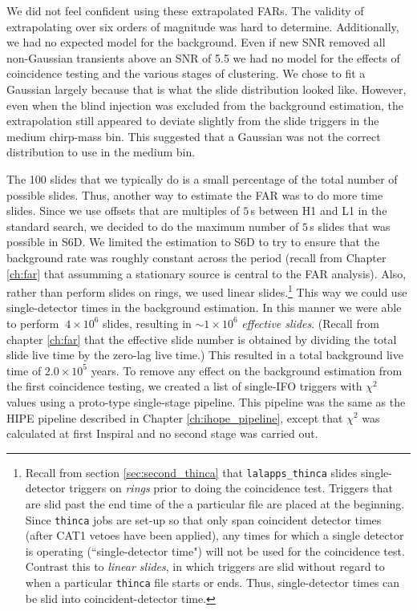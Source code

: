 We did not feel confident using these extrapolated \acp{FAR}. The validity of
extrapolating over six orders of magnitude was hard to determine. Additionally,
we had no expected model for the background. Even if new \ac{SNR} removed all
non-Gaussian transients above an \ac{SNR} of 5.5 we had no model for the
effects of coincidence testing and the various stages of clustering. We chose
to fit a Gaussian largely because that is what the slide distribution looked
like. However, even when the blind injection was excluded from the background
estimation, the extrapolation still appeared to deviate slightly from the slide
triggers in the medium chirp-mass bin. This suggested that a Gaussian was not
the correct distribution to use in the medium bin.

The 100 slides that we typically do is a small percentage of the total number
of possible slides. Thus, another way to estimate the \ac{FAR} was to do more
time slides. Since we use offsets that are multiples of $5\,$s between H1 and
L1 in the standard search, we decided to do the maximum number of $5\,$s slides
that was possible in S6D. We limited the estimation to S6D to try to ensure
that the background rate was roughly constant across the period (recall from
Chapter \ref{ch:far} that assumming a stationary source is central to the
\ac{FAR} analysis). Also, rather than perform slides on rings, we used linear
slides.\footnote{Recall from section \ref{sec:second_thinca} that
\texttt{lalapps\_thinca} slides single-detector triggers on \emph{rings} prior
to doing the coincidence test. Triggers that are slid past the end time of the
a particular file are placed at the beginning. Since \texttt{thinca} jobs are
set-up so that only span coincident detector times (after CAT1 vetoes have been
applied), any times for which a single detector is operating (``single-detector
time") will not be used for the coincidence test. Contrast this to \emph{linear
slides}, in which triggers are slid without regard to when a particular
\texttt{thinca} file starts or ends. Thus, single-detector times can be slid
into coincident-detector time.} This way we could use single-detector times in
the background estimation. In this manner we were able to perform $~4\times
10^6$ slides, resulting in $\sim 1 \times 10^6$ \emph{effective slides}.
(Recall from chapter \ref{ch:far} that the effective slide number is obtained
by dividing the total slide live time by the zero-lag live time.) This resulted
in a total background live time of $2.0\times 10^5$ years. To remove any effect
on the background estimation from the first coincidence testing, we created a
list of single-\ac{IFO} triggers with $\chi^2$ values using a proto-type
single-stage pipeline. This pipeline was the same as the \ac{HIPE} pipeline
described in Chapter \ref{ch:ihope_pipeline}, except that $\chi^2$ was
calculated at first Inspiral and no second stage was carried out. 

